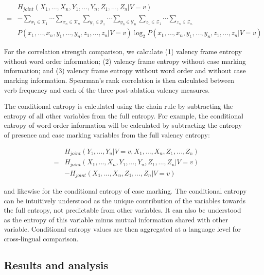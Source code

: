 \begin{equation*}
  \begin{split}
   & H_{joint}(X_1,\ldots,X_{n},Y_1,\ldots,Y_{n},Z_1,\ldots,Z_n|V=v) \\
  =& -\sum\limits_{x_1\in{}\mathcal{X}_1}\cdots\sum\limits_{x_n\in{}\mathcal{X}_n}\sum\limits_{y_1\in{}\mathcal{Y}_1}\cdots\sum\limits_{y_n\in{}\mathcal{Y}_n}\sum\limits_{z_1\in{}\mathcal{Z}_1}\cdots\sum\limits_{z_n\in{}\mathcal{Z}_n}\\
  &{P(x_1,\ldots,x_{n}, y_1,\ldots,y_{n}, z_1,\ldots,z_{n}|V=v)\log_2P(x_1,\ldots,x_{n}, y_1,\ldots,y_{n}, z_1,\ldots,z_{n}|V=v)}
  \end{split}
\end{equation*}

For the correlation strength comparison, we calculate (1) valency frame entropy without word order information; (2) valency frame entropy without case marking information; and (3) valency frame entropy without word order and without case marking information. Spearman's rank correlation is then calculated between verb frequency and each of the three post-ablation valency measures.

The conditional entropy is calculated using the chain rule by subtracting the entropy of all other variables from the full entropy. For example, the conditional entropy of word order information will be calculated by subtracting the entropy of presence and case marking variables from the full valency entropy:

\begin{equation*}
  \begin{split}
   & H_{joint}(Y_1,\ldots,Y_{n}| V = v, X_1,\ldots,X_{n},Z_1,\ldots,Z_n)\\
  =&H_{joint}(X_1,\ldots,X_{n},Y_1,\ldots,Y_{n},Z_1,\ldots,Z_{n}|V=v)  \\
  &- H_{joint}(X_1,\ldots,X_{n},Z_1,\ldots,Z_{n}|V=v)
  \end{split}
\end{equation*}

and likewise for the conditional entropy of case marking. The conditional entropy can be intuitively understood as the unique contribution of the variables towards the full entropy, not predictable from other variables. It can also be understood as the entropy of this variable minus mutual information shared with other variable. Conditional entropy values are then aggregated at a language level for cross-lingual comparison.

\subsection{Results and analysis}

